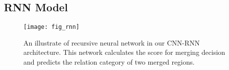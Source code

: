 \documentclass[10pt,twocolumn,letterpaper]{article}
\begin{document}
\subsection{RNN Model}
\label{sub:rnn_model}




\begin{figure}[t]
\centering
\texttt{[image: fig\_rnn]}

 \caption{An illustrate of recursive neural network in our CNN-RNN architecture. This network calculates the score for merging decision and predicts the relation category of two merged regions.}
\label{fig:RNN}
\end{figure}
\end{document}
